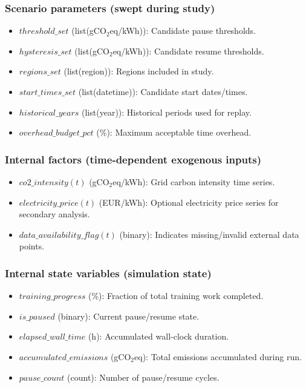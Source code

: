 \subsubsection{Scenario parameters (swept during study)}

\begin{itemize}
  \item $\mathit{threshold\_set}$ (list(gCO$_2$eq/kWh)): Candidate pause thresholds.
  \item $\mathit{hysteresis\_set}$ (list(gCO$_2$eq/kWh)): Candidate resume thresholds.
  \item $\mathit{regions\_set}$ (list(region)): Regions included in study.
  \item $\mathit{start\_times\_set}$ (list(datetime)): Candidate start dates/times.
  \item $\mathit{historical\_years}$ (list(year)): Historical periods used for replay.
  \item $\mathit{overhead\_budget\_pct}$ (\%): Maximum acceptable time overhead.
\end{itemize}

\subsubsection{Internal factors (time-dependent exogenous inputs)}

\begin{itemize}
  \item $\mathit{co2\_intensity}(t)$ (gCO$_2$eq/kWh): Grid carbon intensity time series.
  \item $\mathit{electricity\_price}(t)$ (EUR/kWh): Optional electricity price series for secondary analysis.
  \item $\mathit{data\_availability\_flag}(t)$ (binary): Indicates missing/invalid external data points.
\end{itemize}

\subsubsection{Internal state variables (simulation state)}

\begin{itemize}
  \item $\mathit{training\_progress}$ (\%): Fraction of total training work completed.
  \item $\mathit{is\_paused}$ (binary): Current pause/resume state.
  \item $\mathit{elapsed\_wall\_time}$ (h): Accumulated wall-clock duration.
  \item $\mathit{accumulated\_emissions}$ (gCO$_2$eq): Total emissions accumulated during run.
  \item $\mathit{pause\_count}$ (count): Number of pause/resume cycles.
\end{itemize}


